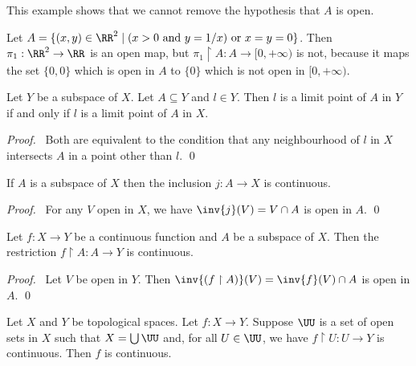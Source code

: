 \begin{example}
    This example shows that we cannot remove the hypothesis that $A$ is open.

    Let $A = \{ (x,y) \in \RR^2 \mid (x > 0 \text{ and } y = 1/x) \text{ or } x=y=0 \}$.
    Then $\pi_1 : \RR^2 \rightarrow \RR$ is an open map, but $\pi_1 \restriction A : A \rightarrow [0, + \infty)$
    is not, because it maps the set $\{ 0,0 \}$ which is open in $A$ to $\{0\}$ which is not open in $[0,+\infty)$.
\end{example}

\begin{proposition}
    \label{proposition:limit_point_subspace}
    Let $Y$ be a subspace of $X$. Let $A \subseteq Y$ and $l \in Y$. Then $l$ is a limit point
    of $A$ in $Y$ if and only if $l$ is a limit point of $A$ in $X$.
\end{proposition}

\begin{proof}
    \pf\ Both are equivalent to the condition that any neighbourhood of $l$ in $X$ intersects $A$ in a point other than $l$. \qed
\end{proof}

\begin{theorem}
    If $A$ is a subspace of $X$ then the inclusion $j : A \rightarrow X$ is continuous.
\end{theorem}

\begin{proof}
    \pf\ For any $V$ open in $X$, we have $\inv{j}(V) = V \cap A$ is open in $A$. \qed
\end{proof}

\begin{theorem}
    \label{theorem:continuous_restriction}
    Let $f : X \rightarrow Y$ be a continuous function and $A$ be a subspace of $X$. Then the restriction
    $f \restriction A : A \rightarrow Y$ is continuous.
\end{theorem}

\begin{proof}
    \pf\ Let $V$ be open in $Y$. Then $\inv{(f \restriction A)}(V) = \inv{f}(V) \cap A$ is open in $A$. \qed
\end{proof}

\begin{theorem}
    Let $X$ and $Y$ be topological spaces. Let $f : X \rightarrow Y$. Suppose $\UU$ is a set of open sets
    in $X$ such that $X = \bigcup \UU$ and, for all $U \in \UU$, we have $f \restriction U : U \rightarrow Y$
    is continuous. Then $f$ is continuous.
\end{theorem}

